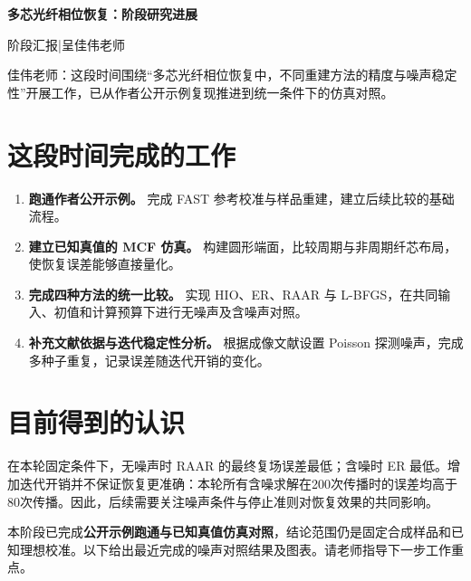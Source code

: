 \documentclass[UTF8,a4paper,11pt,fontset=fandol]{ctexart}
\begin{document}
\begin{center}{\LARGE\bfseries 多芯光纤相位恢复：阶段研究进展}\par\vspace{5pt}阶段汇报\quad |\quad 呈佳伟老师\end{center}
佳伟老师：这段时间围绕“多芯光纤相位恢复中，不同重建方法的精度与噪声稳定性”开展工作，已从作者公开示例复现推进到统一条件下的仿真对照。
\section*{这段时间完成的工作}
\begin{enumerate}
\item \textbf{跑通作者公开示例。} 完成 FAST 参考校准与样品重建，建立后续比较的基础流程。
\item \textbf{建立已知真值的 MCF 仿真。} 构建圆形端面，比较周期与非周期纤芯布局，使恢复误差能够直接量化。
\item \textbf{完成四种方法的统一比较。} 实现 HIO、ER、RAAR 与 L-BFGS，在共同输入、初值和计算预算下进行无噪声及含噪声对照。
\item \textbf{补充文献依据与迭代稳定性分析。} 根据成像文献设置 Poisson 探测噪声，完成多种子重复，记录误差随迭代开销的变化。
\end{enumerate}
\section*{目前得到的认识}
在本轮固定条件下，无噪声时 RAAR 的最终复场误差最低；含噪时 ER 最低。增加迭代开销并不保证恢复更准确：本轮所有含噪求解在200次传播时的误差均高于80次传播。因此，后续需要关注噪声条件与停止准则对恢复效果的共同影响。

本阶段已完成\textbf{公开示例跑通与已知真值仿真对照}，结论范围仍是固定合成样品和已知理想校准。以下给出最近完成的噪声对照结果及图表。请老师指导下一步工作重点。
\end{document}
